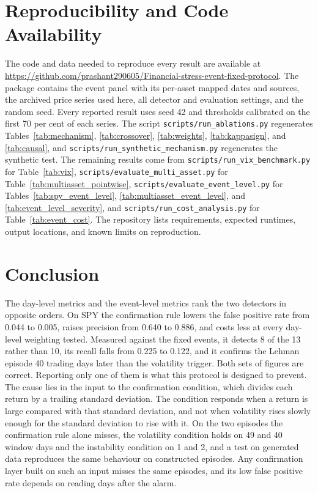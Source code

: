 \documentclass[pdflatex,sn-mathphys-num,iicol]{sn-jnl}
\begin{document}
\section{Reproducibility and Code Availability}
\label{sec:repro}
The code and data needed to reproduce every result are available at \url{https://github.com/prashant290605/Financial-stress-event-fixed-protocol}. The package contains the event panel with its per-asset mapped dates and sources, the archived price series used here, all detector and evaluation settings, and the random seed. Every reported result uses seed 42 and thresholds calibrated on the first 70 per cent of each series. The script \texttt{scripts/run\_ablations.py} regenerates Tables~\ref{tab:mechanism}, \ref{tab:crossover}, \ref{tab:weights}, \ref{tab:kappasign}, and \ref{tab:causal}, and \texttt{scripts/run\_synthetic\_mechanism.py} regenerates the synthetic test. The remaining results come from \texttt{scripts/run\_vix\_benchmark.py} for Table~\ref{tab:vix}, \texttt{scripts/evaluate\_multi\_asset.py} for Table~\ref{tab:multiasset_pointwise}, \texttt{scripts/evaluate\_event\_level.py} for Tables~\ref{tab:spy_event_level}, \ref{tab:multiasset_event_level}, and \ref{tab:event_level_severity}, and \texttt{scripts/run\_cost\_analysis.py} for Table~\ref{tab:event_cost}. The repository lists requirements, expected runtimes, output locations, and known limits on reproduction.

\section{Conclusion}
\label{sec:conclusion}
The day-level metrics and the event-level metrics rank the two detectors in opposite orders. On SPY the confirmation rule lowers the false positive rate from 0.044 to 0.005, raises precision from 0.640 to 0.886, and costs less at every day-level weighting tested. Measured against the fixed events, it detects 8 of the 13 rather than 10, its recall falls from 0.225 to 0.122, and it confirms the Lehman episode 40 trading days later than the volatility trigger. Both sets of figures are correct. Reporting only one of them is what this protocol is designed to prevent. The cause lies in the input to the confirmation condition, which divides each return by a trailing standard deviation. The condition responds when a return is large compared with that standard deviation, and not when volatility rises slowly enough for the standard deviation to rise with it. On the two episodes the confirmation rule alone misses, the volatility condition holds on 49 and 40 window days and the instability condition on 1 and 2, and a test on generated data reproduces the same behaviour on constructed episodes. Any confirmation layer built on such an input misses the same episodes, and its low false positive rate depends on reading days after the alarm.
\end{document}
